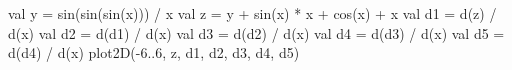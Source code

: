 \documentclass[portrait,a0b,final,a4resizeable]{a0poster}
\def\jointspacing{\vspace{0.3in}}
\begin{document}
\begin{poster}
\begin{multicols}{2}
      \jointspacing

      \vspace*{-2cm}
\null\hspace*{2cm}\begin{minipage}[c]{0.48\columnwidth}
\begin{kotlinlisting}
val y = sin(sin(sin(x))) / x
val z = y + sin(x) * x + cos(x) + x
val d1 = d(z) / d(x)
val d2 = d(d1) / d(x)
val d3 = d(d2) / d(x)
val d4 = d(d3) / d(x)
val d5 = d(d4) / d(x)
plot2D(-6..6, z, d1, d2, d3, d4, d5)
\end{kotlinlisting}
\end{minipage}
    \null\hspace*{2cm}\begin{minipage}[c]{0.40\columnwidth} \vspace*{1.5cm}\center{}\end{minipage}


\end{multicols}
\end{poster}
\end{document}
